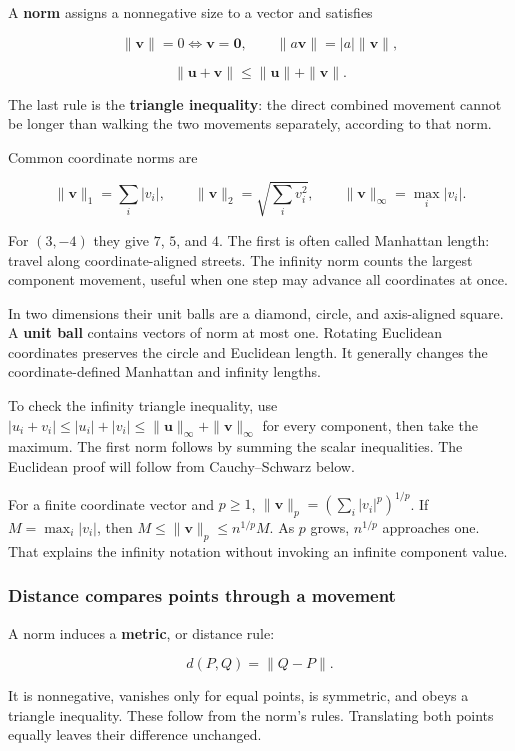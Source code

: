 A \textbf{norm} assigns a nonnegative size to a vector and satisfies

\[
\|\mathbf v\|=0\iff\mathbf v=\mathbf0,\qquad
\|a\mathbf v\|=|a|\|\mathbf v\|,
\]

\[
\|\mathbf u+\mathbf v\|\le\|\mathbf u\|+\|\mathbf v\|.
\]

The last rule is the \textbf{triangle inequality}: the direct combined movement cannot be longer than walking the two movements separately, according to that norm.

Common coordinate norms are

\[
\|\mathbf v\|_1=\sum_i|v_i|,\qquad
\|\mathbf v\|_2=\sqrt{\sum_iv_i^2},\qquad
\|\mathbf v\|_\infty=\max_i|v_i|.
\]

For \((3,-4)\) they give \(7\), \(5\), and \(4\). The first is often called Manhattan length: travel along coordinate-aligned streets. The infinity norm counts the largest component movement, useful when one step may advance all coordinates at once.

In two dimensions their unit balls are a diamond, circle, and axis-aligned square. A \textbf{unit ball} contains vectors of norm at most one. Rotating Euclidean coordinates preserves the circle and Euclidean length. It generally changes the coordinate-defined Manhattan and infinity lengths.

To check the infinity triangle inequality, use \(|u_i+v_i|\le|u_i|+|v_i|\le\|\mathbf u\|_\infty+\|\mathbf v\|_\infty\) for every component, then take the maximum. The first norm follows by summing the scalar inequalities. The Euclidean proof will follow from Cauchy--Schwarz below.

For a finite coordinate vector and \(p\ge1\), \(\|\mathbf v\|_p=(\sum_i|v_i|^p)^{1/p}\). If \(M=\max_i|v_i|\), then \(M\le\|\mathbf v\|_p\le n^{1/p}M\). As \(p\) grows, \(n^{1/p}\) approaches one. That explains the infinity notation without invoking an infinite component value.

\subsubsection{Distance compares points through a movement}\label{01-foundations-i-ch017-distance-compares-points-through-a-movement}

A norm induces a \textbf{metric}, or distance rule:

\[
d(P,Q)=\|Q-P\|.
\]

It is nonnegative, vanishes only for equal points, is symmetric, and obeys a triangle inequality. These follow from the norm's rules. Translating both points equally leaves their difference unchanged.

